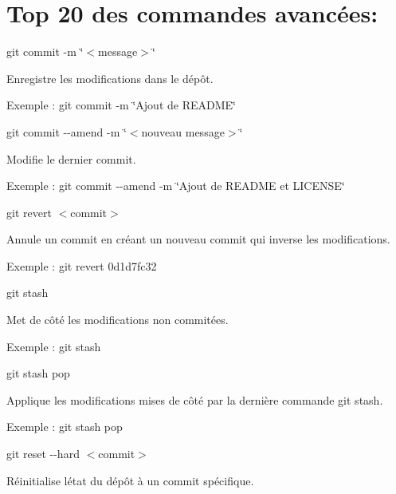 \section*{Top 20 des commandes avancées\+:}


\begin{DoxyEnumerate}
\item {\ttfamily git commit -\/m \char`\"{}$<$message$>$\char`\"{}}
\begin{DoxyItemize}
\item Enregistre les modifications dans le dépôt.
\item Exemple \+: {\ttfamily git commit -\/m \char`\"{}\+Ajout de R\+E\+A\+D\+M\+E\char`\"{}}
\end{DoxyItemize}
\item {\ttfamily git commit -\/-\/amend -\/m \char`\"{}$<$nouveau message$>$\char`\"{}}
\begin{DoxyItemize}
\item Modifie le dernier commit.
\item Exemple \+: {\ttfamily git commit -\/-\/amend -\/m \char`\"{}\+Ajout de R\+E\+A\+D\+M\+E et L\+I\+C\+E\+N\+S\+E\char`\"{}}
\end{DoxyItemize}
\item {\ttfamily git revert $<$commit$>$}
\begin{DoxyItemize}
\item Annule un commit en créant un nouveau commit qui inverse les modifications.
\item Exemple \+: {\ttfamily git revert 0d1d7fc32}
\end{DoxyItemize}
\item {\ttfamily git stash}
\begin{DoxyItemize}
\item Met de côté les modifications non commitées.
\item Exemple \+: {\ttfamily git stash}
\end{DoxyItemize}
\item {\ttfamily git stash pop}
\begin{DoxyItemize}
\item Applique les modifications mises de côté par la dernière commande {\ttfamily git stash}.
\item Exemple \+: {\ttfamily git stash pop}
\end{DoxyItemize}
\item {\ttfamily git reset -\/-\/hard $<$commit$>$}
\begin{DoxyItemize}
\item Réinitialise l\textquotesingle{}état du dépôt à un commit spécifique.

\end{DoxyItemize}
\end{DoxyEnumerate}
